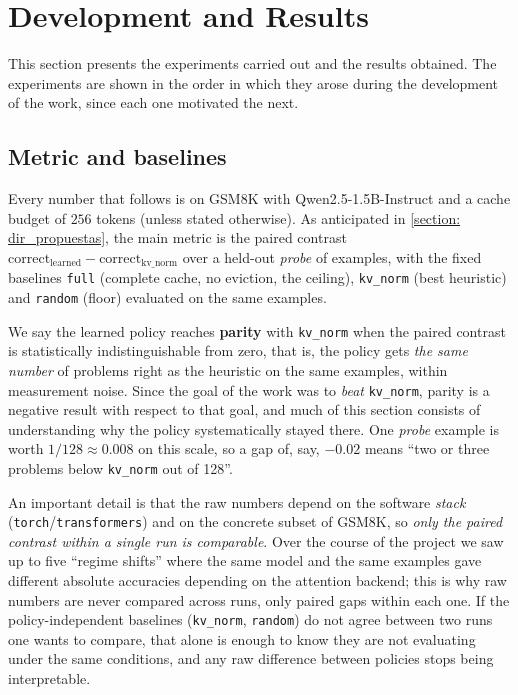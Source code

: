 \section{Development and Results} \label{section: resultados}

This section presents the experiments carried out and the results obtained. The experiments are shown in the order in which they arose during the development of the work, since each one motivated the next.


\subsection{Metric and baselines} \label{subsec: metrica}

Every number that follows is on GSM8K with Qwen2.5-1.5B-Instruct and a cache budget of $256$ tokens (unless stated otherwise). As anticipated in \cref{section: dir_propuestas}, the main metric is the paired contrast $\mathrm{correct_{learned}} - \mathrm{correct_{kv\_norm}}$ over a held-out \textit{probe} of examples, with the fixed baselines \texttt{full} (complete cache, no eviction, the ceiling), \texttt{kv\_norm} (best heuristic) and \texttt{random} (floor) evaluated on the same examples.

We say the learned policy reaches \textbf{parity} with \texttt{kv\_norm} when the paired contrast is statistically indistinguishable from zero, that is, the policy gets \emph{the same number} of problems right as the heuristic on the same examples, within measurement noise. Since the goal of the work was to \emph{beat} \texttt{kv\_norm}, parity is a negative result with respect to that goal, and much of this section consists of understanding why the policy systematically stayed there. One \textit{probe} example is worth $1/128 \approx 0.008$ on this scale, so a gap of, say, $-0.02$ means ``two or three problems below \texttt{kv\_norm} out of 128''.

An important detail is that the raw numbers depend on the software \textit{stack} (\texttt{torch}/\texttt{transformers}) and on the concrete subset of GSM8K, so \emph{only the paired contrast within a single run is comparable}. Over the course of the project we saw up to five ``regime shifts'' where the same model and the same examples gave different absolute accuracies depending on the attention backend; this is why raw numbers are never compared across runs, only paired gaps within each one.
If the policy-independent baselines (\texttt{kv\_norm}, \texttt{random}) do not agree between two runs one wants to compare, that alone is enough to know they are not evaluating under the same conditions, and any raw difference between policies stops being interpretable.

